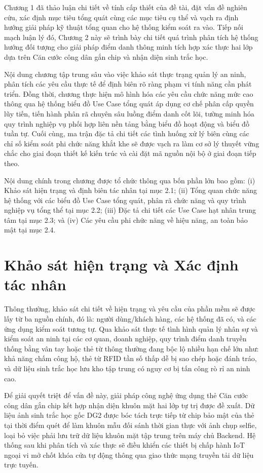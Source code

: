 ﻿\documentclass[../DoAn.tex]{subfiles}
\begin{document}
Chương 1 đã thảo luận chi tiết về tính cấp thiết của đề tài, đặt vấn đề nghiên cứu, xác định mục tiêu tổng quát cùng các mục tiêu cụ thể và vạch ra định hướng giải pháp kỹ thuật tổng quan cho hệ thống kiểm soát ra vào. Tiếp nối mạch luận lý đó, Chương 2 này sẽ trình bày chi tiết quá trình phân tích hệ thống hướng đối tượng cho giải pháp điểm danh thông minh tích hợp xác thực hai lớp dựa trên Căn cước công dân gắn chip và nhận diện sinh trắc học. 

Nội dung chương tập trung sâu vào việc khảo sát thực trạng quản lý an ninh, phân tích các yêu cầu thực tế để định biên rõ ràng phạm vi tính năng cần phát triển. Đồng thời, chương thực hiện mô hình hóa các yêu cầu chức năng mức cao thông qua hệ thống biểu đồ Use Case tổng quát áp dụng cơ chế phân cấp quyền lũy tiến, tiến hành phân rã chuyên sâu luồng điểm danh cốt lõi, tường minh hóa quy trình nghiệp vụ phối hợp liên nền tảng bằng biểu đồ hoạt động và biểu đồ tuần tự. Cuối cùng, ma trận đặc tả chi tiết các tình huống xử lý biên cùng các chỉ số kiểm soát phi chức năng khắt khe sẽ được vạch ra làm cơ sở lý thuyết vững chắc cho giai đoạn thiết kế kiến trúc và cài đặt mã nguồn nội bộ ở giai đoạn tiếp theo.

Nội dung chính trong chương được tổ chức thông qua bốn phần lớn bao gồm: (i) Khảo sát hiện trạng và định biên tác nhân tại mục 2.1; (ii) Tổng quan chức năng hệ thống với các biểu đồ Use Case tổng quát, phân rã chức năng và quy trình nghiệp vụ tổng thể tại mục 2.2; (iii) Đặc tả chi tiết các Use Case hạt nhân trung tâm tại mục 2.3; và (iv) Các yêu cầu phi chức năng về hiệu năng, an toàn bảo mật tại mục 2.4.

\section{Khảo sát hiện trạng và Xác định tác nhân}
\label{section:2.1}

Thông thường, khảo sát chi tiết về hiện trạng và yêu cầu của phần mềm sẽ được lấy từ ba nguồn chính, đó là: người dùng/khách hàng, các hệ thống đã có, và các ứng dụng kiểm soát tương tự. Qua khảo sát thực tế tình hình quản lý nhân sự và kiểm soát an ninh tại các cơ quan, doanh nghiệp, quy trình điểm danh truyền thống bằng vân tay hoặc thẻ từ thông thường đang bộc lộ nhiều hạn chế lớn như: khả năng chấm công hộ, thẻ từ RFID tần số thấp dễ bị sao chép hoặc đánh tráo, và dữ liệu sinh trắc học lưu kho tập trung có nguy cơ bị tấn công rò rỉ an ninh cao.

Để giải quyết triệt để vấn đề này, giải pháp công nghệ ứng dụng thẻ Căn cước công dân gắn chip kết hợp nhận diện khuôn mặt hai lớp tự trị được đề xuất. Dữ liệu ảnh sinh trắc học gốc DG2 được bóc tách trực tiếp từ chip bảo mật của thẻ tại thời điểm quét để làm khuôn mẫu đối sánh thời gian thực với ảnh chụp selfie, loại bỏ việc phải lưu trữ dữ liệu khuôn mặt tập trung trên máy chủ Backend. Hệ thống sau khi phân tích và xác thực sẽ điều khiển các thiết bị chấp hành IoT ngoại vi mở chốt khóa cửa tự động thông qua giao thức mạng truyền tải dữ liệu trực tuyến.
\end{document}
